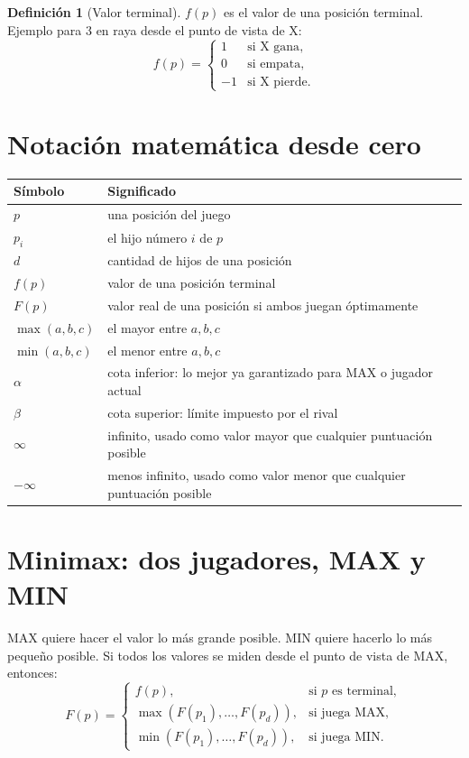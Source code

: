 \documentclass[11pt,a4paper]{article}
\theoremstyle{definition}
\newtheorem{definition}{Definición}[section]
\begin{document}
\begin{definition}[Valor terminal]
$f(p)$ es el valor de una posición terminal. Ejemplo para 3 en raya desde el punto de vista de X:
\[
 f(p)=\begin{cases}
 1 & \text{si X gana},\\
 0 & \text{si empata},\\
 -1 & \text{si X pierde}.
 \end{cases}
\]
\end{definition}

\section{Notación matemática desde cero}

\begin{center}
\begin{tabular}{ll}
\hline
Símbolo & Significado \\
\hline
$p$ & una posición del juego \\
$p_i$ & el hijo número $i$ de $p$ \\
$d$ & cantidad de hijos de una posición \\
$f(p)$ & valor de una posición terminal \\
$F(p)$ & valor real de una posición si ambos juegan óptimamente \\
$\max(a,b,c)$ & el mayor entre $a,b,c$ \\
$\min(a,b,c)$ & el menor entre $a,b,c$ \\
$\alpha$ & cota inferior: lo mejor ya garantizado para MAX o jugador actual \\
$\beta$ & cota superior: límite impuesto por el rival \\
$\infty$ & infinito, usado como valor mayor que cualquier puntuación posible \\
$-\infty$ & menos infinito, usado como valor menor que cualquier puntuación posible \\
\hline
\end{tabular}
\end{center}

\section{Minimax: dos jugadores, MAX y MIN}

MAX quiere hacer el valor lo más grande posible. MIN quiere hacerlo lo más pequeño posible. Si todos los valores se miden desde el punto de vista de MAX, entonces:
\[
F(p)=\begin{cases}
 f(p), & \text{si }p\text{ es terminal},\\
 \max(F(p_1),\ldots,F(p_d)), & \text{si juega MAX},\\
 \min(F(p_1),\ldots,F(p_d)), & \text{si juega MIN}.
\end{cases}
\]
\end{document}
